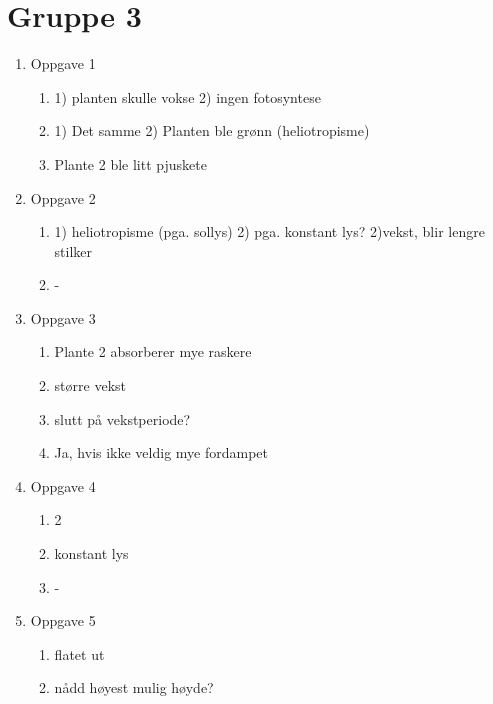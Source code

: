  
 


\section{Gruppe 3}
\begin{enumerate}
	\item Oppgave 1
	\begin{enumerate}
		\item 1) planten skulle vokse 2) ingen fotosyntese
		\item 1) Det samme 2) Planten ble grønn (heliotropisme) 
		\item Plante 2 ble litt pjuskete
	\end{enumerate}

	\item Oppgave 2
	\begin{enumerate}
		\item 1) heliotropisme (pga. sollys) 2) pga. konstant lys? 2)vekst, blir lengre stilker
		\item - 
	\end{enumerate}	

	\item Oppgave 3
	\begin{enumerate}
		\item Plante 2 absorberer mye raskere
		\item større vekst
		\item slutt på vekstperiode?
		\item Ja, hvis ikke veldig mye fordampet
	\end{enumerate}

	\item Oppgave 4
	\begin{enumerate}
		\item 2
		\item konstant lys
		\item -
	\end{enumerate}

	\item Oppgave 5
	\begin{enumerate}
		\item flatet ut
		\item nådd høyest mulig høyde?
	\end{enumerate}
\end{enumerate}
\newpage
